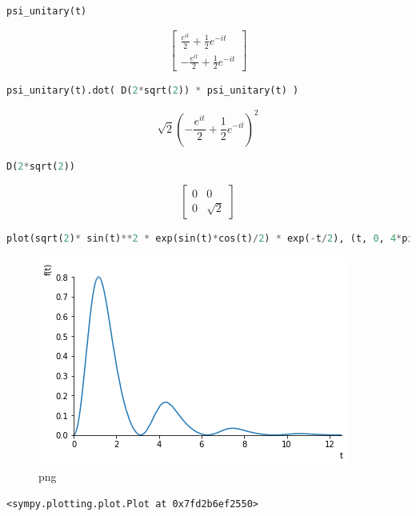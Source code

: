 \begin{lstlisting}[language=Python]
psi_unitary(t)
\end{lstlisting}

\[\left[\begin{matrix}\frac{e^{i t}}{2} + \frac{1}{2} e^{- i t}\\- \frac{e^{i t}}{2} + \frac{1}{2} e^{- i t}\end{matrix}\right]\]

\begin{lstlisting}[language=Python]
psi_unitary(t).dot( D(2*sqrt(2)) * psi_unitary(t) )
\end{lstlisting}

\[\sqrt{2} \left(- \frac{e^{i t}}{2} + \frac{1}{2} e^{- i t}\right)^{2}\]

\begin{lstlisting}[language=Python]
D(2*sqrt(2))
\end{lstlisting}

\[\left[\begin{matrix}0 & 0\\0 & \sqrt{2}\end{matrix}\right]\]

\begin{lstlisting}[language=Python]
plot(sqrt(2)* sin(t)**2 * exp(sin(t)*cos(t)/2) * exp(-t/2), (t, 0, 4*pi))
\end{lstlisting}

\begin{figure}
\centering
\includegraphics{img/2ldetect/prob_pw_expvD.png}
\caption{png}
\end{figure}

\begin{lstlisting}
<sympy.plotting.plot.Plot at 0x7fd2b6ef2550>
\end{lstlisting}

